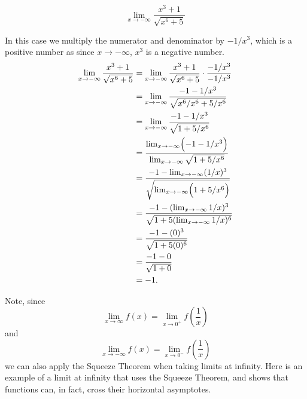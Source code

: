 \documentclass{ximera}
\begin{document}
\begin{example}

\[
\lim_{x\to -\infty} \frac{x^3+1}{\sqrt{x^6+5}}
\]
\begin{explanation}
In this case we multiply the numerator and denominator by $-1/x^3$,
which is a positive number as since $x\to -\infty$, $x^3$ is a negative
number.
\begin{align*}
\lim_{x\to -\infty} \frac{x^3+1}{\sqrt{x^6+5}} &= \lim_{x\to -\infty} \frac{x^3+1}{\sqrt{x^6+5}} \cdot \frac{-1/x^3}{-1/x^3}\\
&= \lim_{x\to -\infty} \frac{-1-1/x^3}{\sqrt{x^6/x^6+5/x^6}}\\
&= \lim_{x\to -\infty} \frac{-1-1/x^3}{\sqrt{1+5/x^6}}\\
&= \frac{ \lim_{x\to -\infty}\Bigl(-1-1/x^3\Bigr)}{\lim_{x\to -\infty}\sqrt{1+5/x^6}}\\
&= \frac{ -1-\lim_{x\to -\infty}(1/x)^3}{\sqrt{\lim_{x\to -\infty}\Bigl(1+5/x^6\Bigr)}}\\
&= \frac{ -1-(\lim_{x\to -\infty}1/x)^3}{\sqrt{1+5(\lim_{x\to -\infty}1/x)^6}}\\
&= \frac{ -1-(0)^3}{\sqrt{1+5(0)^6}}\\
&= \frac{ -1-0}{\sqrt{1+0}}\\
&= -1.
\end{align*}
\end{explanation}
\end{example}

Note, since
\[
\lim_{x\to \infty} f(x) = \lim_{x\to 0^+} f\left(\frac{1}{x}\right)
\]
and
\[
\lim_{x\to -\infty} f(x) = \lim_{x\to 0^-} f\left(\frac{1}{x}\right)
\]
we can also apply the Squeeze Theorem when taking limits at infinity.
Here is an example of a limit at infinity that uses the Squeeze
Theorem, and shows that functions can, in fact, cross their horizontal
asymptotes.
\end{document}
